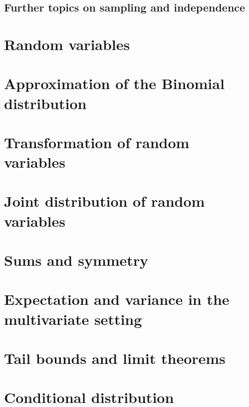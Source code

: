 \subsection{Further topics on sampling and independence}
\label{subsec:sampling-indep}




\section{Random variables}
\label{sec:random-variables}


\section{Approximation of the Binomial distribution}
\label{sec:appr-binom-distr}


\section{Transformation of random variables}
\label{sec:transf-rand-vari}


\section{Joint distribution of random variables}
\label{sec:joint-distr-rand}


\section{Sums and symmetry}
\label{sec:sums-symmetry}


\section{Expectation and variance in the multivariate setting}
\label{sec:expect-vari-mult}


\section{Tail bounds and limit theorems}
\label{sec:tail-bounds-limit}


\section{Conditional distribution}
\label{sec:cond-distr}





